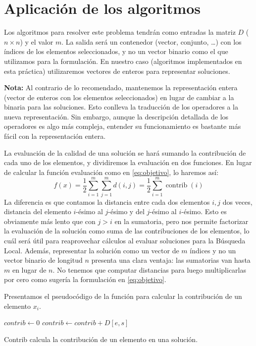 \documentclass{article}
\begin{document}
\pagebreak

\section{Aplicación de los algoritmos}

Los algoritmos para resolver este problema tendrán como entradas la matriz $D$ ($n\times n$) y el valor $m$. La salida será un contenedor
(vector, conjunto, \ldots) con los índices de los elementos seleccionados, y no un vector binario como el que utilizamos para la formulación.
 En nuestro caso (algoritmos implementados en esta práctica) utilizaremos vectores de enteros para representar soluciones.

\textbf{Nota:} Al contrario de lo recomendado, mantenemos la representación entera (vector de enteros con los elementos seleccionados) en lugar de cambiar a la binaria para las soluciones.
Esto conlleva la traducción de los operadores a la nueva representación. Sin embargo, aunque la descripción detallada de los operadores es
algo más compleja, entender su funcionamiento es bastante más fácil con la representación entera. 

La evaluación de la calidad de una solución se hará
sumando la contribución de cada uno de los elementos, y dividiremos la evaluación en dos funciones. En lugar de calcular la función evaluación como en
\eqref{eq:objetivo}, lo haremos así:
\begin{equation} \label{eq:objetivo-fact}
f(x)=\frac{1}{2}\sum_{i=1}^{m}\sum_{j=1}^m d(i,j)=\frac{1}{2}\sum_{i=1}^{m}\operatorname{contrib}(i)
\end{equation}
La diferencia es que contamos la distancia entre cada dos elementos $i,j$ dos veces, distancia del elemento $i$-ésimo al $j$-ésimo y del $j$-ésimo al
$i$-ésimo. Esto es obviamente más lento que con $j>i$ en la sumatoria, pero nos permite factorizar la evaluación de la solución como suma de las
 contribuciones de los elementos, lo cuál será útil para reaprovechar cálculos al evaluar soluciones para la Búsqueda Local.
 Además, representar la solución como un vector de $m$ índices y no un vector binario de longitud $n$ presenta una clara ventaja: las sumatorias van hasta
 $m$ en lugar de $n$. No tenemos que computar distancias para luego multiplicarlas por cero como sugería la formulación en \eqref{eq:objetivo}.

Presentamos el pseudocódigo de la función para calcular la contribución de un elemento $x_i$.

\begin{algorithm}[H]
	\DontPrintSemicolon %
	$contrib \gets 0$\;
	 {
		$contrib \gets contrib + D[e,s]$ 
	}
	\;
	\caption{{\sc Contrib} calcula la contribución de un elemento en una solución.}
	\label{alg:contrib}
\end{algorithm}
\end{document}
